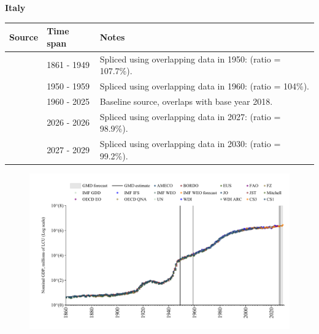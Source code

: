 \documentclass[12pt,a4paper,landscape]{article}
\begin{document}
\begin{adjustbox}{max totalsize={\paperwidth}{\paperheight},center}
\begin{minipage}[t][\textheight][t]{\textwidth}
\vspace*{0.5cm}
{}
\begin{center}
{\Large\bfseries Italy}
\end{center}
\vspace{0.5cm}
\begin{table}[H]
\centering
\small
\begin{tabular}{|l|l|l|}
\hline
\textbf{Source} & \textbf{Time span} & \textbf{Notes} \\
\hline
\rowcolor{white}\cite{CS1_ITA}& 1861 - 1949 &Spliced using overlapping data in 1950: (ratio = 107.7\%).\\
\rowcolor{lightgray}\cite{IMF_GDD}& 1950 - 1959 &Spliced using overlapping data in 1960: (ratio = 104\%).\\
\rowcolor{white}\cite{OECD_EO}& 1960 - 2025 &Baseline source, overlaps with base year 2018.\\
\rowcolor{lightgray}\cite{AMECO}& 2026 - 2026 &Spliced using overlapping data in 2027: (ratio = 98.9\%).\\
\rowcolor{white}\cite{IMF_WEO_forecast}& 2027 - 2029 &Spliced using overlapping data in 2030: (ratio = 99.2\%).\\
\hline
\end{tabular}
\end{table}
\begin{figure}[H]
\centering
\includegraphics[width=\textwidth,height=0.6\textheight,keepaspectratio]{graphs/ITA_nGDP.pdf}
\end{figure}
\end{minipage}
\end{adjustbox}
\end{document}
